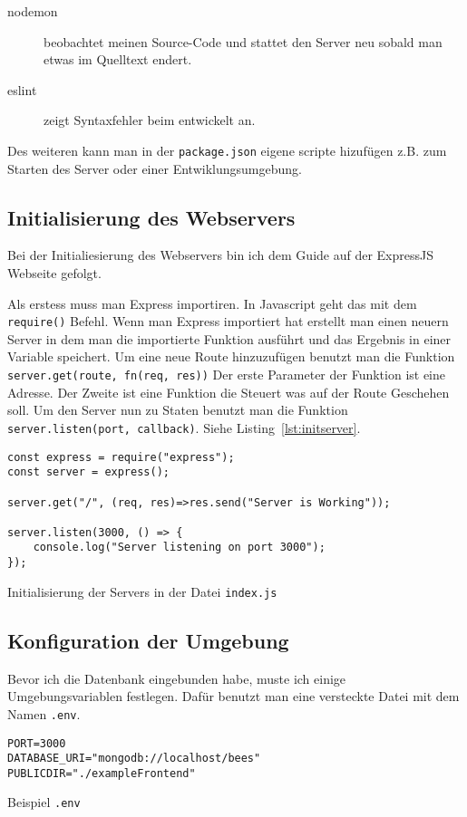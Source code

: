 \documentclass[a4paper, ngerman, 12pt]{scrartcl}
\newcommand{\js}[1]{\texttt{#1}}
\begin{document}
\begin{description}
	\item[nodemon] beobachtet meinen Source-Code und stattet den Server neu sobald man etwas im Quelltext endert.
	\item[eslint] zeigt Syntaxfehler beim entwickelt an.
\end{description}

Des weiteren kann man in der \texttt{package.json} eigene scripte hizufügen z.B. zum Starten des Server oder einer Entwiklungsumgebung.

\subsection{Initialisierung des Webservers} %

Bei der Initialiesierung des Webservers bin ich dem Guide auf der ExpressJS Webseite gefolgt.\autocite{Expressjs}

Als erstess muss man Express importiren. In Javascript geht das mit dem \js{require()} Befehl.
Wenn man Express importiert hat erstellt man einen neuern Server in dem man die importierte Funktion ausführt und das Ergebnis in einer Variable speichert.
Um eine neue Route hinzuzufügen benutzt man die Funktion \js{server.get(route, fn(req, res))}
Der erste Parameter der Funktion ist eine Adresse. Der Zweite ist eine Funktion die Steuert was auf der Route Geschehen soll.
Um den Server nun zu Staten benutzt man die Funktion \js{server.listen(port, callback)}.
Siehe Listing~\ref{lst:initserver}.

\begin{listing}[ht]
\centering
\begin{verbatim}
const express = require("express");
const server = express();

server.get("/", (req, res)=>res.send("Server is Working"));

server.listen(3000, () => {
    console.log("Server listening on port 3000");
});
\end{verbatim}
\caption{Initialisierung der Servers in der Datei \texttt{index.js}\label{lst:initserver}}
\end{listing}


\subsection{Konfiguration der Umgebung} %

Bevor ich die Datenbank eingebunden habe, muste ich einige Umgebungsvariablen festlegen.
Dafür benutzt man eine versteckte Datei mit dem Namen \texttt{.env}.
\begin{listing}[ht]
\centering
\begin{verbatim}
PORT=3000
DATABASE_URI="mongodb://localhost/bees"
PUBLICDIR="./exampleFrontend"
\end{verbatim}
\caption{Beispiel \texttt{.env}}\label{lst:dotenv}
\end{listing}
\end{document}
